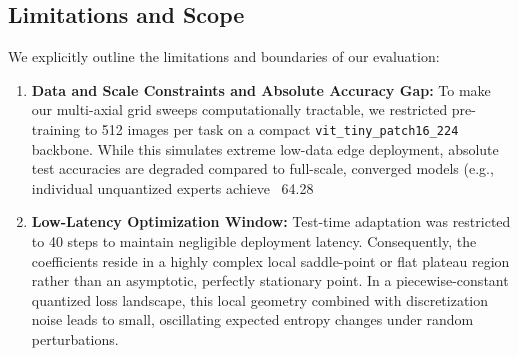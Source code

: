 \subsection{Limitations and Scope}
We explicitly outline the limitations and boundaries of our evaluation:
\begin{enumerate}
  \item \textbf{Data and Scale Constraints and Absolute Accuracy Gap:} To make our multi-axial grid sweeps computationally tractable, we restricted pre-training to 512 images per task on a compact \texttt{vit\_tiny\_patch16\_224} backbone. While this simulates extreme low-data edge deployment, absolute test accuracies are degraded compared to full-scale, converged models (e.g., individual unquantized experts achieve ~64.28%
  \item \textbf{Low-Latency Optimization Window:} Test-time adaptation was restricted to 40 steps to maintain negligible deployment latency. Consequently, the coefficients reside in a highly complex local saddle-point or flat plateau region rather than an asymptotic, perfectly stationary point. In a piecewise-constant quantized loss landscape, this local geometry combined with discretization noise leads to small, oscillating expected entropy changes under random perturbations.

\end{enumerate}
